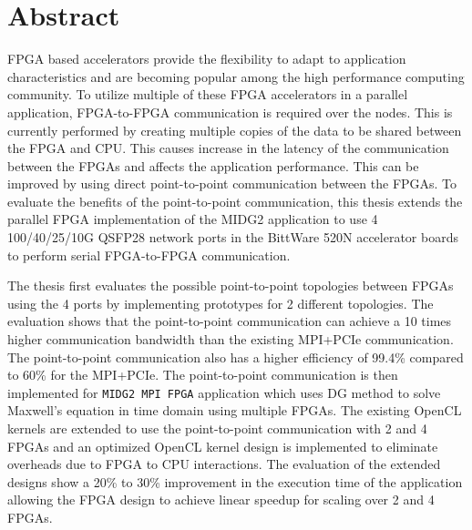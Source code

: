 \chapter{Abstract}

FPGA based accelerators provide the flexibility to adapt to application
characteristics and are becoming popular among the high performance computing
community. To utilize multiple of these FPGA accelerators in a parallel application,
FPGA-to-FPGA communication is required over the nodes. This is
currently performed by creating multiple copies of the data to be
shared between the FPGA and CPU. This causes increase in the latency
of the communication between the FPGAs and affects the application performance.
This can be improved by using direct point-to-point communication
between the FPGAs. To evaluate the benefits of the point-to-point
communication, this thesis extends the parallel FPGA implementation
of the MIDG2 application to use 4 100/40/25/10G QSFP28 network ports
in the BittWare 520N accelerator boards to perform serial FPGA-to-FPGA communication.

The thesis first evaluates the possible point-to-point topologies between
FPGAs using the 4 ports by implementing prototypes for 2 different topologies.
The evaluation shows that the point-to-point communication can achieve a 10
times higher communication bandwidth than the existing MPI+PCIe communication.
The point-to-point communication also has a higher efficiency of 99.4\% compared
to 60\% for the MPI+PCIe. The point-to-point communication is then implemented
for \texttt{MIDG2 MPI FPGA} application which uses \acl{DG} method to solve Maxwell’s equation
in time domain using multiple FPGAs. The existing OpenCL kernels are extended to
use the point-to-point communication with 2 and 4 FPGAs and an optimized OpenCL
kernel design is implemented to eliminate overheads due to FPGA to CPU interactions.
The evaluation of the extended designs show a 20\% to 30\% improvement in the
execution time of the application allowing the FPGA design to achieve linear speedup for
scaling over 2 and 4 FPGAs.